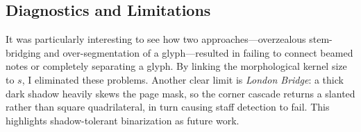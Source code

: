 \subsection{Diagnostics and Limitations}
\label{sec:results:limits}
It was particularly interesting to see how two approaches---overzealous
stem-bridging and over-segmentation of a glyph---resulted in failing to connect
beamed notes or completely separating a glyph. By linking the morphological
kernel size to $s$, I eliminated these problems. Another clear limit is
\emph{London Bridge}: a thick dark shadow heavily skews the page mask, so the
corner cascade returns a slanted rather than square quadrilateral, in turn
causing staff detection to fail. This highlights shadow-tolerant binarization as
future work.
